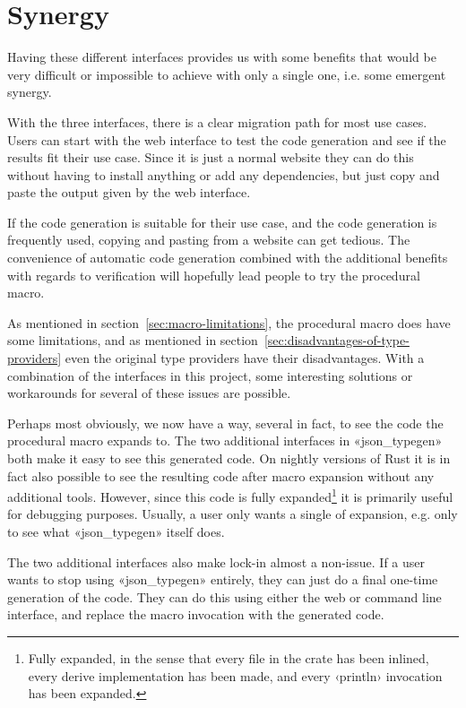 \section{Synergy}

Having these different interfaces provides us with some benefits that would be very difficult or impossible to achieve with only a single one, i.e. some emergent synergy.

With the three interfaces, there is a clear migration path for most use cases. Users can start with the web interface to test the code generation and see if the results fit their use case. Since it is just a normal website they can do this without having to install anything or add any dependencies, but just copy and paste the output given by the web interface.

If the code generation is suitable for their use case, and the code generation is frequently used, copying and pasting from a website can get tedious. The convenience of automatic code generation combined with the additional benefits with regards to verification will hopefully lead people to try the procedural macro.

As mentioned in section~\ref{sec:macro-limitations}, the procedural macro does have some limitations, and as mentioned in section~\ref{sec:disadvantages-of-type-providers} even the original type providers have their disadvantages. With a combination of the interfaces in this project, some interesting solutions or workarounds for several of these issues are possible.

Perhaps most obviously, we now have a way, several in fact, to see the code the procedural macro expands to. The two additional interfaces in «json_typegen» both make it easy to see this generated code. On nightly versions of Rust it is in fact also possible to see the resulting code after macro expansion without any additional tools. However, since this code is fully expanded\footnote{Fully expanded, in the sense that every file in the crate has been inlined, every derive implementation has been made, and every ‹println› invocation has been expanded.} it is primarily useful for debugging purposes. Usually, a user only wants a single  of expansion, e.g. only to see what «json_typegen» itself does.

The two additional interfaces also make lock-in almost a non-issue. If a user wants to stop using «json_typegen» entirely, they can just do a final one-time generation of the code. They can do this using either the web or command line interface, and replace the macro invocation with the generated code.

